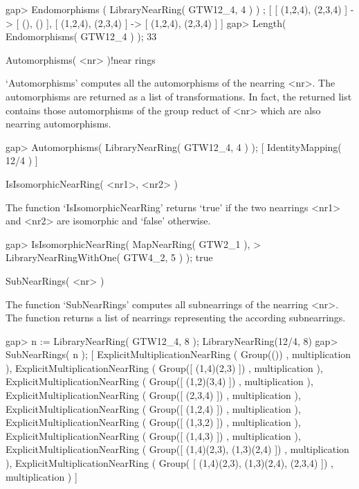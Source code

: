 \beginexample
    gap> Endomorphisms ( LibraryNearRing( GTW12_4, 4 ) ) ;
    [ [ (1,2,4), (2,3,4) ] -> [ (), () ], 
      [ (1,2,4), (2,3,4) ] -> [ (1,2,4), (2,3,4) ] ]
    gap> Length( Endomorphisms( GTW12_4 ) );
    33
\endexample



\>Automorphisms( <nr> )!{near rings}

`Automorphisms' computes all the automorphisms of the nearring <nr>. 
The automorphisms are returned as a list of transformations. In fact, the
returned list contains those automorphisms of the group reduct of <nr>
which are also nearring automorphisms.

\beginexample
    gap> Automorphisms( LibraryNearRing( GTW12_4, 4 ) );
    [ IdentityMapping( 12/4 ) ]
\endexample



\>IsIsomorphicNearRing( <nr1>, <nr2> )

The function `IsIsomorphicNearRing' returns `true' if the two nearrings
<nr1> and <nr2> are isomorphic and `false' otherwise.

\beginexample
    gap> IsIsomorphicNearRing( MapNearRing( GTW2_1 ),                       
    > LibraryNearRingWithOne( GTW4_2, 5 ) );
    true
\endexample



\>SubNearRings( <nr> )

The function `SubNearRings' computes all subnearrings of the nearring 
<nr>. The function returns a list of nearrings representing the 
according subnearrings.

\beginexample
    gap> n := LibraryNearRing( GTW12_4, 8 );
    LibraryNearRing(12/4, 8)
    gap> SubNearRings( n );
    [ ExplicitMultiplicationNearRing ( Group(()) , multiplication ),
      ExplicitMultiplicationNearRing ( Group([ (1,4)(2,3) ]) , multiplication ),
      ExplicitMultiplicationNearRing ( Group([ (1,2)(3,4) ]) , multiplication ),
      ExplicitMultiplicationNearRing ( Group([ (2,3,4) ]) , multiplication ),
      ExplicitMultiplicationNearRing ( Group([ (1,2,4) ]) , multiplication ),
      ExplicitMultiplicationNearRing ( Group([ (1,3,2) ]) , multiplication ),
      ExplicitMultiplicationNearRing ( Group([ (1,4,3) ]) , multiplication ),
      ExplicitMultiplicationNearRing ( Group([ (1,4)(2,3), (1,3)(2,4)
         ]) , multiplication ), ExplicitMultiplicationNearRing ( Group(
        [ (1,4)(2,3), (1,3)(2,4), (2,3,4) ]) , multiplication ) ]
\endexample

